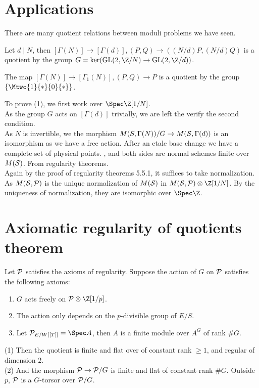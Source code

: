 \section{Applications}
There are many quotient relations between moduli problems we have seen.
\begin{theorem}
	\item Let $d\mid N$, then $[\Gamma(N)]\to[\Gamma(d)], (P,Q)\to ((N/d)P,(N/d)Q)$ is a quotient by the group $G = \ker(\text{GL}(2,\Z/N)\to \text{GL}(2,\Z/d))$.
	\item The map $[\Gamma(N)]\to[\Gamma_1(N)], (P,Q)\to P$ is a quotient by the group $\{\Mtwo{1}{*}{0}{*}\}$.
\end{theorem}
To prove (1), we first work over $\Spec \Z[1/N]$. \\
As the group $G$ acts on $[\Gamma(d)]$ trivially, we are left the verify the second condition. \\
As $N$ is invertible, we the morphism $M(S,\Gamma(N))/G\to M(\mathcal{S}, \Gamma(d))$ is an isomorphism as we have a free action. {After an etale base change we have a complete set of physical points. }, and both sides are normal schemes finite over $M(\mathcal{S})$. {From regularity theorems}. \\
Again by the proof of regularity theorems 5.5.1, it suffices to take normalization. \\
As $M(\mathcal{S},\mathcal{P})$ is the unique normalization of $M(\mathcal{S})$ in $M(\cS,\cP)\otimes \Z[1/N]$.
By the uniqueness of normalization, they are isomorphic over $\Spec \Z$. \\
\section{Axiomatic regularity of quotients theorem}
\begin{theorem}
	Let $\mathcal{P}$ satisfies the axioms of regularity. Suppose the action of $G$ on $\mathcal{P}$ satisfies the following axioms:
	\begin{enumerate}
		\item $G$ acts freely on $\cP\otimes \Z[1/p]$.
		\item The action only depends on the $p$-divisible group of $E/S$.
		\item Let $\cP_{E/W[[T]]}=\Spec A$, then $A$ is a finite module over $A^G$ of rank $\#G$.
	\end{enumerate}
	(1) Then the quotient is finite and flat over \ellr of constant rank $\geq 1$, and regular of dimension $2$. \\
	(2) And the morphism $\mathcal{P}\to \mathcal{P}/G$ is finite and flat of constant rank $\#G$. Outside $p$, $\mathcal{P}$ is a $G$-torsor over $\mathcal{P}/G$.
\end{theorem}

